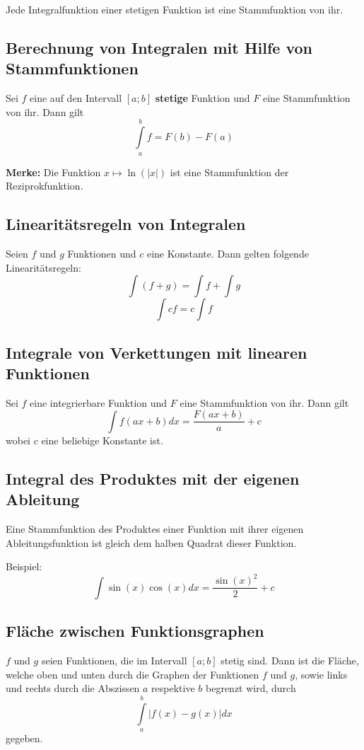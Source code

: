 \documentclass[10pt,a4paper]{scrartcl}
\begin{document}
Jede Integralfunktion einer stetigen Funktion ist eine Stammfunktion von ihr.


\subsection{Berechnung von Integralen mit Hilfe von Stammfunktionen}

Sei $f$ eine auf den Intervall $[a;b]$ \textbf{stetige} Funktion und $F$ eine Stammfunktion von ihr. Dann gilt
$$\int\limits_a^b f = F(b) - F(a)$$

\textbf{Merke:} Die Funktion $x \mapsto \ln(|x|)$ ist eine Stammfunktion der Reziprokfunktion.


\subsection{Linearitätsregeln von Integralen}

Seien $f$ und $g$ Funktionen und $c$ eine Konstante. Dann gelten folgende Linearitätsregeln:
$$\int (f+g) = \int f + \int g$$
$$\int cf = c \int f$$


\subsection{Integrale von Verkettungen mit linearen Funktionen}
Sei $f$ eine integrierbare Funktion und $F$ eine Stammfunktion von ihr. Dann gilt
$$\int f(ax+b)dx = \frac{F(ax+b)}{a} + c$$
wobei $c$ eine beliebige Konstante ist.


\subsection{Integral des Produktes mit der eigenen Ableitung} 
Eine Stammfunktion des Produktes einer Funktion mit ihrer eigenen
Ableitungsfunktion ist gleich dem halben Quadrat dieser Funktion.

Beispiel:
$$\int \sin(x) \cos(x) dx = \frac{\sin(x)^2}{2} + c$$


\subsection{Fläche zwischen Funktionsgraphen} 

$f$ und $g$ seien Funktionen, die im Intervall $[a;b]$ stetig sind. Dann ist
die Fläche, welche oben und unten durch die Graphen der Funktionen $f$ und $g$,
sowie links und rechts durch die Abszissen $a$ respektive $b$ begrenzt wird, durch
$$\int\limits_a^b |f(x) - g(x)| dx$$
gegeben.
\end{document}
